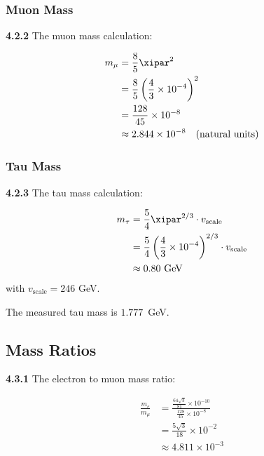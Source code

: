 	\subsubsection{Muon Mass}
	
	\noindent \textbf{4.2.2} The muon mass calculation:
	\begin{keyresult}
		\begin{align}
			m_\mu &= \frac{8}{5} \xipar^{2} \\
			&= \frac{8}{5} \left( \frac{4}{3} \times 10^{-4} \right)^{2} \\
			&= \frac{128}{45} \times 10^{-8} \\
			&\approx 2.844 \times 10^{-8} \quad \text{(natural units)}
		\end{align}
	\end{keyresult}
	
	\subsubsection{Tau Mass}
	
	\noindent \textbf{4.2.3} The tau mass calculation:
	\begin{keyresult}
		\begin{align}
			m_\tau &= \frac{5}{4} \xipar^{2/3} \cdot v_{\text{scale}} \\
			&= \frac{5}{4} \left( \frac{4}{3} \times 10^{-4} \right)^{2/3} \cdot v_{\text{scale}} \\
			&\approx 0.80 \text{ GeV}
		\end{align}
		with $v_{\text{scale}} = 246$ GeV.
	\end{keyresult}
	The measured tau mass is $1.777$~GeV.

	\subsection{Mass Ratios}
	
	\noindent \textbf{4.3.1} The electron to muon mass ratio:
	\begin{keyresult}
		\begin{align}
			\frac{m_e}{m_\mu} &= \frac{\frac{64 \sqrt{3}}{81} \times 10^{-10}}{\frac{128}{45} \times 10^{-8}} \\
			&= \frac{5 \sqrt{3}}{18} \times 10^{-2} \\
			&\approx 4.811 \times 10^{-3}
		\end{align}
	\end{keyresult}
	

